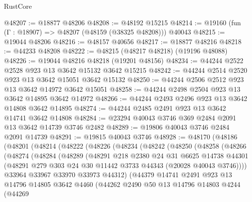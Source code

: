 \begin{lexlean}{RustCore}
\begin{coremodule}
@48207 := @18877 @48206
@48208 := @48192 @15215
@48214 := @19160 (fun (Γ : @18907) => @48207 (@48159 (@38325 @48208))) @40043
@48215 := @19044 @48206
@48216 := @48157 @40656
@48217 := @18877 @48216
@48218 := @44233 @48208
@48222 := @48215 (@48217 @48218) (@19196 @48088)
@48226 := @19044 @48216 @48218 (@19201 @48156)
@48234 := @44244 @2522 @2528 @923 @13 @3642 @15132 @3642 @15215
@48242 := @44244 @2514 @2520 @923 @13 @3642 @15051 @3642 @15132
@48250 := @44244 @2506 @2512 @923 @13 @3642 @14972 @3642 @15051
@48258 := @44244 @2498 @2504 @923 @13 @3642 @14895 @3642 @14972
@48266 := @44244 @2493 @2496 @923 @13 @3642 @14808 @3642 @14895
@48274 := @44244 @2485 @2491 @923 @13 @3642 @14741 @3642 @14808
@48284 := @23294 @40043 @3746 @369 @2484 @2091 @13 @3642 @14739 @3746 @2482
@48289 := @19806 @40043 @3746 @2484 @2091 @14739
@48291 := @19815 @40043 @3746
@48928 := @48170
    (@48186
      (@48201
        (@48214
          (@48222
            (@48226
              (@48234
                (@48242
                  (@48250
                    (@48258
                      (@48266
                        (@48274
                          (@48284
                            (@48289
                              (@48291
                                @218
                                @2380
                                @24
                                @31
                                @6625
                                @14738
                                @44301
                                (@48291
                                  @279
                                  @303
                                  @24
                                  @30
                                  @11442
                                  @3733
                                  @44343
                                  (@20028 @40043 @3746))))
                            @33964
                            @33967
                            @33970
                            @33973
                            @44312)
                          (@44379
                            @14741
                            @2491
                            @923
                            @13
                            @14796
                            @14805
                            @3642
                            @4460
                            (@44262
                              @2490
                              @50
                              @13
                              @14796
                              @14803
                              @4244
                              (@44269

\end{coremodule}
\end{lexlean}
